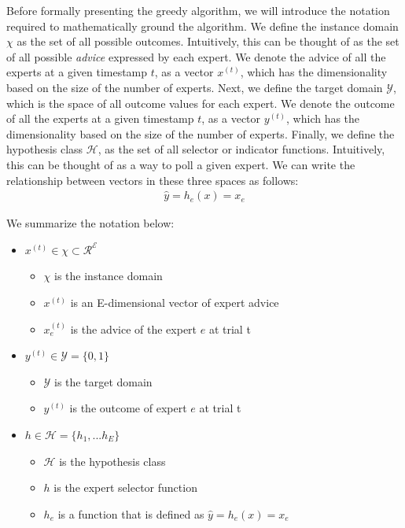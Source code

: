 \documentclass[11pt]{article}
\begin{document}
Before formally presenting the greedy algorithm, we will introduce the notation required to mathematically ground the algorithm. We define the instance domain $\chi$ as the set of all possible outcomes. Intuitively, this can be thought of as the set of all possible \textit{advice} expressed by each expert. We denote the advice of all the experts at a given timestamp $t$, as a vector $x^{(t)}$, which has the dimensionality based on the size of the number of experts. Next, we define the target domain $\mathcal{Y}$, which is the space of all outcome values for each expert. We denote the outcome of all the experts at a given timestamp $t$, as a vector $y^{(t)}$, which has the dimensionality based on the size of the number of experts. Finally, we define the hypothesis class $\mathcal{H}$, as the set of all selector or indicator functions. Intuitively, this can be thought of as a way to poll a given expert. We can write the relationship between vectors in these three spaces as follows:
\begin{align}
  \hat{y} = h_e(x)=x_e
\end{align}

We summarize the notation below:
\begin{itemize}
    \item $x^{(t)} \in \chi \subset \mathcal{R^E}$
    \begin{itemize}
      \item $\chi$ is the instance domain
      \item $x^{(t)}$ is an E-dimensional vector of expert advice
      \item $x_e^{(t)}$ is the advice of the expert $e$ at trial t
    \end{itemize}
    \item $y^{(t)} \in \mathcal{Y} =\{0,1\}$
    \begin{itemize}
      \item $\mathcal{Y}$ is the target domain
      \item $y^{(t)}$ is the outcome of expert $e$ at trial t
    \end{itemize}
    \item $h \in \mathcal{H} =\{h_1,...h_E\}$
    \begin{itemize}
      \item $\mathcal{H}$ is the hypothesis class
      \item $h$ is the expert selector function
      \item $h_e$ is a function that is defined as $\hat{y} = h_e(x)=x_e$
    \end{itemize}
\end{itemize}
\end{document}
